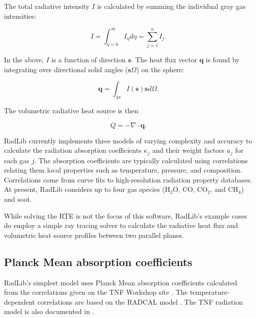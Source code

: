 \documentclass[preprint,12pt, a4paper]{elsarticle}
\begin{document}
The total radiative intensity $I$ is calculated by summing the individual gray gas intensities:
%
\begin{linenomath}
\begin{equation}
	I=\int_{\eta=0}^{\infty}I_{\eta}d\eta=\sum_{j=1}^n I_j.
\end{equation}
\end{linenomath}
%
In the above, $I$ is a function of direction $\mathbf{s}$. The heat flux vector $\mathbf{q}$ is found by integrating over directional solid angles ($\mathbf{s}\Omega$) on the sphere:
%
\begin{linenomath}
\begin{equation}
    \mathbf{q} = \int_{4\pi}I(\mathbf{s})\mathbf{s}d\Omega.
\end{equation}
\end{linenomath}
%
The volumetric radiative heat source is then 
%
\begin{linenomath}
\begin{equation}
    Q = -\nabla\cdot\mathbf{q}.
\end{equation}
\end{linenomath}
%

RadLib currently implements three models of varying complexity and accuracy to calculate the radiation absorption coefficients $\kappa_j$ and their weight factors $a_j$ for each gas $j$. The absorption coefficients are typically calculated using correlations relating them local properties such as temperature, pressure, and composition. Correlations come from curve fits to high-resolution radiation property databases. At present, RadLib considers up to four gas species (H$_2$O, CO, CO$_2$, and CH$_4$) and soot. 

While solving the RTE is not the focus of this software, RadLib's example cases do employ a simple ray tracing solver to calculate the radiative heat flux and volumetric heat source profiles between two parallel planes. 



\subsection{Planck Mean absorption coefficients} \label{s:planckmean}

RadLib's simplest model uses Planck Mean absorption coefficients calculated from the correlations given on the TNF Workshop site \citep{Smith_2003}. The temperature-dependent correlations are based on the RADCAL model \citep{Grosshandler_1993}. The TNF radiation model is also documented in \citep{Barlow_2001}.
\end{document}
